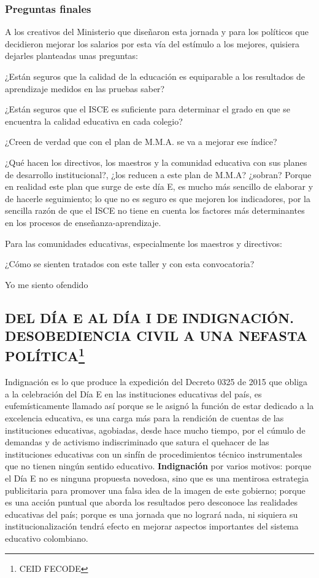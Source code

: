 \documentclass[10pt]{article}
\begin{document}
\subsubsection*{Preguntas finales}
A los creativos del Ministerio que diseñaron esta jornada y para los políticos que decidieron mejorar los salarios por esta vía del estímulo a los mejores, quisiera dejarles planteadas unas preguntas:

¿Están seguros que la calidad de la educación es equiparable a los resultados de aprendizaje medidos en las pruebas saber?

¿Están seguros que el ISCE es suficiente para determinar el grado en que se encuentra la calidad educativa en cada colegio?

¿Creen de verdad que con el plan de M.M.A. se va a mejorar ese índice?

¿Qué hacen los directivos, los maestros y la comunidad educativa con sus planes de desarrollo institucional?, ¿los reducen a este plan de M.M.A? ¿sobran? Porque en realidad este plan que surge de este día E, es mucho más sencillo de elaborar
y de hacerle seguimiento; lo que no es seguro es que mejoren los indicadores, por la sencilla razón de que el ISCE no tiene en cuenta los factores más determinantes en los procesos de enseñanza-aprendizaje.

Para las comunidades educativas, especialmente los maestros y directivos:

¿Cómo se sienten tratados con este taller y con esta convocatoria?

Yo me siento ofendido
\subsection*{DEL DÍA E AL DÍA I DE INDIGNACIÓN.
DESOBEDIENCIA CIVIL A UNA NEFASTA POLÍTICA\footnote{CEID FECODE}}
Indignación es lo que produce la expedición del Decreto 0325 de 2015 que obliga a la celebración del Día E en las instituciones educativas del país, es eufemísticamente llamado así porque se le asignó la función de estar dedicado a la excelencia educativa, es una carga más para la rendición de cuentas de las instituciones educativas, agobiadas, desde hace mucho tiempo, por el cúmulo de demandas y de activismo indiscriminado que satura el quehacer de las instituciones educativas con un sinfín de procedimientos técnico instrumentales que no tienen ningún sentido educativo. \textbf{Indignación} por varios motivos: porque el Día E no es ninguna propuesta novedosa, sino que es una mentirosa estrategia publicitaria para promover una falsa idea de la imagen de este gobierno; porque es una acción puntual que aborda los resultados pero desconoce las realidades educativas del país; porque es una jornada que no logrará nada, ni siquiera su institucionalización tendrá efecto en mejorar aspectos importantes del sistema educativo colombiano.
\end{document}
